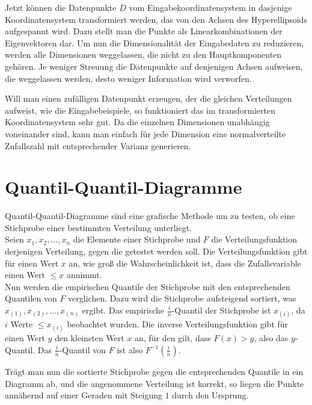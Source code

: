  Jetzt können die Datenpunkte $D$ vom Eingabekoordinatensystem in dasjenige Koordinatensystem transformiert werden, das von den Achsen des Hyperellipsoids aufgespannt wird. Dazu stellt man die Punkte als Linearkombinationen der Eigenvektoren dar. 
 Um nun die Dimensionalität der Eingabedaten zu reduzieren, werden alle Dimensionen weggelassen, die nicht zu den Hauptkomponenten gehören. Je weniger Streuung die Datenpunkte auf denjenigen Achsen aufweisen, die weggelassen werden, desto weniger Information wird verworfen.
 
 Will man einen zufälligen Datenpunkt erzeugen, der die gleichen Verteilungen aufweist, wie die Eingabebeispiele, so funktioniert das im transformierten Koordinatensystem sehr gut. Da die einzelnen Dimensionen unabhängig voneinander sind, kann man einfach für jede Dimension eine normalverteilte Zufallszahl mit entsprechender Varianz generieren.
 
 
\section{Quantil-Quantil-Diagramme} 
\label{qqdiagrams}

Quantil-Quantil-Diagramme sind eine grafische Methode um zu testen, ob eine Stichprobe einer bestimmten Verteilung unterliegt. \\
Seien $x_1, x_2,\dots, x_n$ die Elemente einer Stichprobe und $F$ die Verteilungsfunktion derjenigen Verteilung, gegen die getestet werden soll. Die Verteilungsfunktion gibt für einen Wert $x$ an, wie groß die Wahrscheinlichkeit ist, dass die Zufallsvariable einen Wert $\leq x$ annimmt.\\
Nun werden die empirischen Quantile der Stichprobe mit den entsprechenden Quantilen von $F$ verglichen. Dazu wird die Stichprobe aufsteigend sortiert, was $x_{(1)}, x_{(2)},\dots, x_{(n)}$ ergibt. 
Das empirische $\frac{i}{n}$-Quantil der Stichprobe ist $x_{(i)}$, da $i$ Werte $\leq x_{(i)}$ beobachtet wurden. Die inverse Verteilungsfunktion gibt für einen Wert $y$ den kleinsten Wert $x$ an, für den gilt, dass $F(x) > y$, also das $y$-Quantil. Das $\frac{i}{n}$-Quantil von $F$ ist also $F^{-1}\left(\frac{i}{n}\right)$.

Trägt man nun die sortierte Stichprobe gegen die entsprechenden Quantile in ein Diagramm ab, und die angenommene Verteilung ist korrekt, so liegen die Punkte annähernd auf einer Geraden mit Steigung $1$ durch den Ursprung. \cite[Kapitel 1 und 2]{QQPlots}

